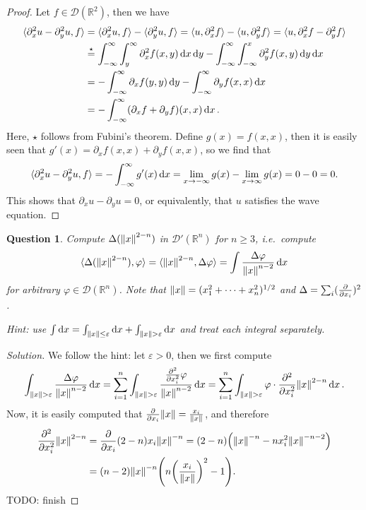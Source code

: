 \documentclass{article}
\theoremstyle{plain}
\newtheorem{question}{Question}
\theoremstyle{remark}
\newenvironment{solution}{\begin{proof}[Solution]\renewcommand\qedsymbol{}}{\end{proof}}
\renewcommand{\epsilon}{\varepsilon}
\renewcommand{\phi}{\varphi}
\newcommand{\Bb}{\mathbb}
\newcommand{\Cal}{\mathcal}
\newcommand{\RR}{\Bb R}
\newcommand{\DD}{\Cal D}
\DeclarePairedDelimiter{\ang}{\langle}{\rangle}
\newcommand\eps\epsilon
\newcommand\TODO{{\color{red} TODO: }}
\newcommand\pt\partial
\begin{document}
\begin{proof}
	Let $f \in \DD(\RR^2)$, then we have
	\begin{align*}
		\ang{\pt_x^2 u - \pt_y^2 u, f} &= \ang{\pt_x^2 u, f}- \ang{\pt_y^2 u, f} = \ang{u, \pt_x^2 f} - \ang{u, \pt_y^2 f} = \ang{u, \pt_x^2 f - \pt_y^2 f} \\
		&\overset\star= \int_{-\infty}^\infty \int_{y}^\infty \pt_x^2 f(x, y) \dd{x}\dd{y} - \int_{-\infty}^\infty \int_{-\infty}^x \pt_y^2 f(x, y) \dd{y} \dd{x} \\
		&= - \int_{-\infty}^\infty \pt_x f(y, y) \dd{y} - \int_{-\infty}^\infty \pt_y f(x, x) \dd{x}
		\\
		&= - \int_{-\infty}^\infty (\pt_xf + \pt_yf)(x, x) \dd{x}.
	\end{align*}
Here, $\star$ follows from Fubini's theorem. 
Define $g(x) = f(x, x)$, then it is easily seen that $g'(x) = \pt_x f(x, x) + \pt_y f(x, x)$, so we find that
\[
\ang{\pt_x^2 u - \pt_y^2 u, f} = 
- \int_{-\infty}^\infty g'(x) \dd{x} = \lim_{x\to -\infty} g(x) - \lim_{x\to\infty} g(x) = 0 - 0 = 0. 
\]
This shows that $\pt_x u - \pt_y u = 0$, or equivalently, that $u$ satisfies the wave equation. 
\end{proof}

\begin{question}
	Compute $\Delta(\norm{x}^{2-n})$ in $\DD'(\RR^n)$ for $n \geq 3$, i.e.\ compute
	\[
	\ang{\Delta (\norm{x}^{2-n}), \phi} = \ang{\norm{x}^{2-n}, \Delta\phi} = \int \frac{\Delta\phi}{\norm{x}^{n-2}} \dd{x}
	\]
	for arbitrary $\phi \in \DD(\RR^n)$. Note that $\norm{x} = (x_1^2 +\dotsb +x_n^2)^{1/2}$ and $\Delta = \sum_i (\pdv{x_i})^2$. 
	
	\emph{Hint:} use $\int\dd{x} = \int_{\norm{x}\leq\eps}\dd{x} + \int_{\norm{x}>\eps}\dd{x}$ and treat each integral separately. 
\end{question}

\begin{solution}
	We follow the hint: let $\eps > 0$, then we first compute
	\[
	\int_{\norm{x} > \eps} \frac{\Delta\phi}{\norm{x}^{n-2}} \dd{x} = \sum_{i=1}^n \int_{\norm{x} > \eps} \frac{\pdv[2]{x_i} \phi}{\norm{x}^{n-2}}\dd{x} = \sum_{i=1}^n \int_{\norm{x} > \eps} \phi \cdot \pdv[2]{x_i} \norm{x}^{2-n} \dd{x}. 
	\]
	Now, it is easily computed that $\pdv{x_i} \norm{x} = \frac{x_i}{\norm{x}}$, and therefore 
	\begin{align*}
	\pdv[2]{x_i} \norm{x}^{2-n} &= \pdv{x_i} (2-n) x_i \norm{x}^{-n} = (2-n) \qty(\norm{x}^{-n} - n x_i^2 \norm{x}^{-n-2}) \\
	&= (n-2)\norm{x}^{-n} \qty(n \qty(\frac{x_i}{\norm{x}})^2 - 1). 
	\end{align*}
\TODO finish
\end{solution}
\end{document}
